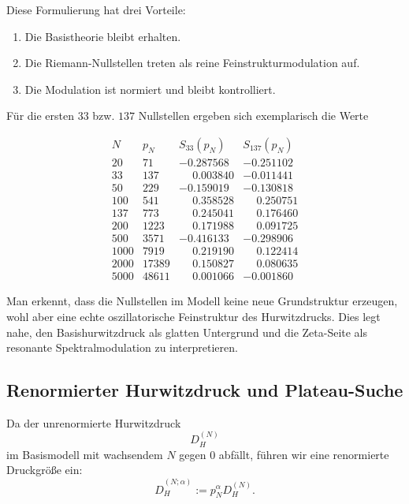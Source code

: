 \documentclass[12pt,a4paper]{article}
\theoremstyle{definition}
\begin{document}
	Diese Formulierung hat drei Vorteile:
	
	\begin{enumerate}
		\item Die Basistheorie bleibt erhalten.
		\item Die Riemann-Nullstellen treten als reine Feinstrukturmodulation auf.
		\item Die Modulation ist normiert und bleibt kontrolliert.
	\end{enumerate}
	
	Für die ersten \(33\) bzw. \(137\) Nullstellen ergeben sich exemplarisch die Werte
	
	\[
	\begin{array}{r|r|r|r}
		N & p_N & S_{33}(p_N) & S_{137}(p_N)\\
		\hline
		20   & 71    & -0.287568 & -0.251102 \\
		33   & 137   & \phantom{-}0.003840 & -0.011441 \\
		50   & 229   & -0.159019 & -0.130818 \\
		100  & 541   & \phantom{-}0.358528 & \phantom{-}0.250751 \\
		137  & 773   & \phantom{-}0.245041 & \phantom{-}0.176460 \\
		200  & 1223  & \phantom{-}0.171988 & \phantom{-}0.091725 \\
		500  & 3571  & -0.416133 & -0.298906 \\
		1000 & 7919  & \phantom{-}0.219190 & \phantom{-}0.122414 \\
		2000 & 17389 & \phantom{-}0.150827 & \phantom{-}0.080635 \\
		5000 & 48611 & \phantom{-}0.001066 & -0.001860
	\end{array}
	\]
	
	Man erkennt, dass die Nullstellen im Modell keine neue Grundstruktur erzeugen, wohl aber eine echte oszillatorische Feinstruktur des Hurwitzdrucks. Dies legt nahe, den Basishurwitzdruck als glatten Untergrund und die Zeta-Seite als resonante Spektralmodulation zu interpretieren.
	
	\subsection{Renormierter Hurwitzdruck und Plateau-Suche}
	
	Da der unrenormierte Hurwitzdruck
	\[
	D_H^{(N)}
	\]
	im Basismodell mit wachsendem \(N\) gegen \(0\) abfällt, führen wir eine renormierte Druckgröße ein:
	\[
	\widehat D_H^{(N;\alpha)}:=p_N^\alpha D_H^{(N)}.
	\]
	
\end{document}
